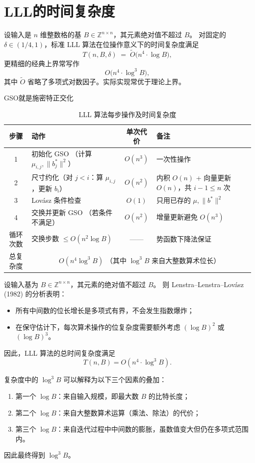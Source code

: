 \section{LLL的时间复杂度}
\begin{theorem}
设输入是 $n$ 维整数格的基 $B\in\mathbb{Z}^{n\times n}$，其元素绝对值不超过 $B$。
对固定的 $\delta\in(1/4,1)$，标准 LLL 算法在位操作意义下的时间复杂度满足
\[
T(n,B,\delta)\;=\;\widetilde{O}\!\bigl(n^{4}\cdot \log B\bigr),
\]
更精细的经典上界常写作
\[
O\!\bigl(n^{4}\cdot \log^{3} B\bigr),
\]
其中 $\widetilde{O}$ 省略了多项式对数因子。实际实现常优于理论上界。
\end{theorem}
GSO就是施密特正交化
\begin{table}[h]
\centering
\begin{tabular}{|c|l|c|l|}
\hline
步骤 & 动作 & 单次代价 & 备注 \\
\hline
1 & 初始化 GSO （计算 $\mu_{i,j}, \|b_j^*\|^2$） & $O(n^3)$ & 一次性操作 \\
\hline
2 & 尺寸约化（对 $j<i$：算 $\mu_{i,j}$，更新 $b_i$） & $O(n^2)$ & 内积 $O(n)$ + 向量更新 $O(n)$，共 $i-1\le n$ 次 \\
\hline
3 & Lovász 条件检查 & $O(1)$ & 只用已存的 $\mu,\|b^*\|^2$ \\
\hline
4 & 交换并更新 GSO （若条件不满足） & $O(n^2)$ & 增量更新避免 $O(n^3)$ \\
\hline
循环次数 & 交换步数 $\le O(n^2 \log B)$ & —— & 势函数下降法保证 \\
\hline
总复杂度 & \multicolumn{3}{c|}{$O(n^4 \log^3 B)$ （其中 $\log^3 B$ 来自大整数算术位长）} \\
\hline
\end{tabular}
\caption{LLL 算法每步操作及时间复杂度}
\end{table}
\begin{theorem}
设输入基为 $B \in \mathbb{Z}^{n \times n}$，其元素的绝对值不超过 $B$。  
则 Lenstra--Lenstra--Lovász (1982) 的分析表明：  
\begin{itemize}
  \item 所有中间数的位长增长是多项式有界，不会发生指数爆炸；
  \item 在保守估计下，每次算术操作的位复杂度需要额外考虑 $(\log B)^2$ 或 $(\log B)^3$。
\end{itemize}
因此，LLL 算法的总时间复杂度满足
\[
T(n,B) = O\!\left(n^4 \cdot \log^3 B\right).
\]
\end{theorem}

\begin{proposition}
复杂度中的 $\log^3 B$ 可以解释为以下三个因素的叠加：
\begin{enumerate}
  \item 第一个 $\log B$：来自输入规模，即最大数 $B$ 的比特长度；
  \item 第二个 $\log B$：来自大整数算术运算（乘法、除法）的代价；
  \item 第三个 $\log B$：来自迭代过程中中间数的膨胀，虽数值变大但仍在多项式范围内。
\end{enumerate}
因此最终得到 $\log^3 B$。
\end{proposition}
